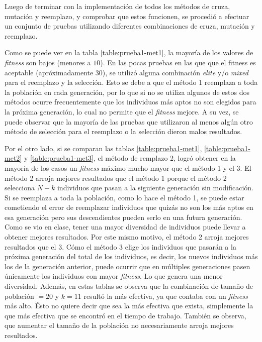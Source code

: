 \documentclass[11pt,a4paper]{article}
\begin{document}
Luego de terminar con la implementación de todos los métodos de cruza, mutación y reemplazo, y comprobar que estos funcionen, se procedió a efectuar un conjunto de pruebas utilizando diferentes combinaciones de cruza, mutación y reemplazo.

Como se puede ver en la tabla \ref{table:prueba1-met1}, la mayoría de los valores de \emph{fitness} son bajos (menores a $10$). En las pocas pruebas en las que que el fitness es aceptable (apróximadamente 30), se utilizó alguna combinación \emph{elite} y/o \emph{mixed} para el reemplazo y la selección. Esto se debe a que el método 1 reemplaza a toda la población en cada generación, por lo que si no se utiliza algunos de estos dos métodos ocurre frecuentemente que los individuos más aptos no son elegidos para la próxima generación, lo cual no permite que el \emph{fitness} mejore. A su vez, se puede observar que la mayoría de las pruebas que utilizaron al menos algún otro método de selección para el reemplazo o la selección dieron malos resultados.

Por el otro lado, si se comparan las tablas \ref{table:prueba1-met1}, \ref{table:prueba1-met2} y \ref{table:prueba1-met3}, el método de remplazo 2, logró obtener en la mayoría de los casos un \emph{fitness} máximo mucho mayor que el método 1 y el 3. El método 2 arroja mejores resultados que el método 1 porque el método 2 selecciona $N- k$ individuos que pasan a la siguiente generación sin modificación. Si se reemplaza a toda la población, como lo hace el método 1, se puede estar cometiendo el error de reemplazar individuos que quizás no son los más aptos en esa generación pero sus descendientes pueden serlo en una futura generación. Como se vio en clase, tener una mayor diversidad de individuos puede llevar a obtener mejores resultados. Por este mismo motivo, el método 2 arroja mejores resultados que el 3. Cómo el método 3 elige los individuos que pasarán a la próxima generación del total de los individuos, es decir, los nuevos individuos más los de la generación anterior, puede ocurrir que en múltiples generaciones pasen únicamente los individuos con mayor \emph{fitness}. Lo que genera una menor diversidad. Además, en estas tablas se observa que la combinación de tamaño de población $=20$ y $k=11$ resultó la más efectiva, ya que contaba con un \emph{fitness} más alto. Ésto no quiere decir que sea la más efectiva que exista, simplemente la que más efectiva que se encontró en el tiempo de trabajo. También se observa, que aumentar el tamaño de la población no necesariamente arroja mejores resultados.
\end{document}

